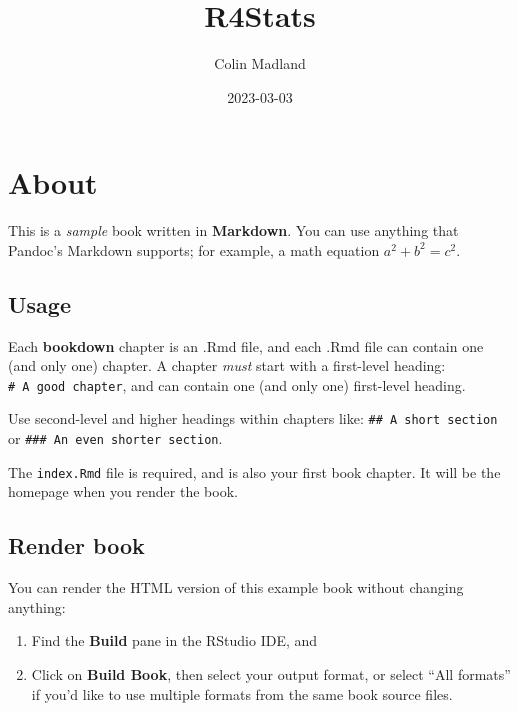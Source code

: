 \documentclass[
]{book}
\title{R4Stats}
\author{Colin Madland}
\date{2023-03-03}
\theoremstyle{definition}
\theoremstyle{definition}
\theoremstyle{definition}
\theoremstyle{definition}
\theoremstyle{remark}
\begin{document}
\maketitle

{
\setcounter{tocdepth}{1}
\tableofcontents
}
\hypertarget{about}{%
\chapter*{About}\label{about}}

This is a \emph{sample} book written in \textbf{Markdown}. You can use anything that Pandoc's Markdown supports; for example, a math equation \(a^2 + b^2 = c^2\).

\hypertarget{usage}{%
\section*{Usage}\label{usage}}

Each \textbf{bookdown} chapter is an .Rmd file, and each .Rmd file can contain one (and only one) chapter. A chapter \emph{must} start with a first-level heading: \texttt{\#\ A\ good\ chapter}, and can contain one (and only one) first-level heading.

Use second-level and higher headings within chapters like: \texttt{\#\#\ A\ short\ section} or \texttt{\#\#\#\ An\ even\ shorter\ section}.

The \texttt{index.Rmd} file is required, and is also your first book chapter. It will be the homepage when you render the book.

\hypertarget{render-book}{%
\section*{Render book}\label{render-book}}

You can render the HTML version of this example book without changing anything:

\begin{enumerate}
\def\labelenumi{\arabic{enumi}.}
\item
  Find the \textbf{Build} pane in the RStudio IDE, and
\item
  Click on \textbf{Build Book}, then select your output format, or select ``All formats'' if you'd like to use multiple formats from the same book source files.
\end{enumerate}
\end{document}
